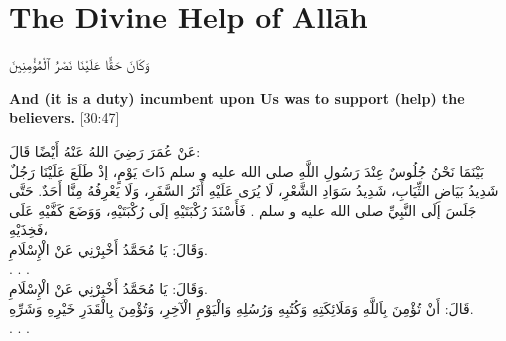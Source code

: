 \chapter{The Divine Help of All\=ah} 

\begin{center}
    \begin{RLtext}
            وَكَانَ حَقًّا عَلَيْنَا نَصْرُ ٱلْمُؤْمِنِينَ 
    \end{RLtext}
    \textbf{And (it is a duty) incumbent upon Us was to support (help) the believers.} [30:47]
\end{center}
\begin{RLtext}
    عَنْ عُمَرَ رَضِيَ اللهُ عَنْهُ أَيْضًا قَالَ:\\
    بَيْنَمَا نَحْنُ جُلُوسٌ عِنْدَ رَسُولِ اللَّهِ صلى الله عليه و سلم ذَاتَ يَوْمٍ، إذْ طَلَعَ عَلَيْنَا رَجُلٌ شَدِيدُ بَيَاضِ الثِّيَابِ، شَدِيدُ سَوَادِ الشَّعْرِ، لَا يُرَى عَلَيْهِ أَثَرُ السَّفَرِ، وَلَا يَعْرِفُهُ مِنَّا أَحَدٌ. حَتَّى جَلَسَ إلَى النَّبِيِّ صلى الله عليه و سلم . فَأَسْنَدَ رُكْبَتَيْهِ إلَى رُكْبَتَيْهِ، وَوَضَعَ كَفَّيْهِ عَلَى فَخِذَيْهِ،\\
    وَقَالَ: يَا مُحَمَّدُ أَخْبِرْنِي عَنْ الْإِسْلَامِ.\\
    . . .\\
    وَقَالَ: يَا مُحَمَّدُ أَخْبِرْنِي عَنْ الْإِسْلَامِ.\\
    قَالَ: أَنْ تُؤْمِنَ بِاَللَّهِ وَمَلَائِكَتِهِ وَكُتُبِهِ وَرُسُلِهِ وَالْيَوْمِ الْآخِرِ، وَتُؤْمِنَ بِالْقَدَرِ خَيْرِهِ وَشَرِّهِ.\\
    . . .\\
    [رَوَاهُ مُسْلِمٌ]
\end{RLtext}
